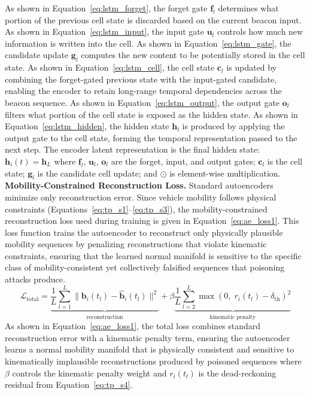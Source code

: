 \documentclass[12pt, a4paper]{report}
\begin{document}
As shown in Equation~\ref{eq:lstm_forget}, the forget gate $\mathbf{f}_l$
determines what portion of the previous cell state is discarded based on
the current beacon input. As shown in Equation~\ref{eq:lstm_input}, the
input gate $\mathbf{u}_l$ controls how much new information is written
into the cell. As shown in Equation~\ref{eq:lstm_gate}, the candidate
update $\mathbf{g}_l$ computes the new content to be potentially stored
in the cell state. As shown in Equation~\ref{eq:lstm_cell}, the cell
state $\mathbf{c}_l$ is updated by combining the forget-gated previous
state with the input-gated candidate, enabling the encoder to retain
long-range temporal dependencies across the beacon sequence. As shown in
Equation~\ref{eq:lstm_output}, the output gate $\mathbf{o}_l$ filters
what portion of the cell state is exposed as the hidden state. As shown
in Equation~\ref{eq:lstm_hidden}, the hidden state $\mathbf{h}_l$ is
produced by applying the output gate to the cell state, forming the
temporal representation passed to the next step. The encoder latent
representation is the final hidden state: $\mathbf{h}_i(t) = \mathbf{h}_L$ where $\mathbf{f}_l$, $\mathbf{u}_l$, $\mathbf{o}_l$ are the forget,
input, and output gates; $\mathbf{c}_l$ is the cell state; $\mathbf{g}_l$
is the candidate cell update; and $\odot$ is element-wise multiplication.
\newline
\newline
\textbf{Mobility-Constrained Reconstruction Loss.}
Standard autoencoders minimize only reconstruction error. Since vehicle
mobility follows physical constraints
(Equations~\ref{eq:tp_s1}--\ref{eq:tp_s3}), the mobility-constrained
reconstruction loss used during training is given in
Equation~\ref{eq:ae_loss1}.
\newline
\newline
This loss function trains the autoencoder to reconstruct only
physically plausible mobility sequences by penalizing reconstructions
that violate kinematic constraints, ensuring that the learned normal
manifold is sensitive to the specific class of mobility-consistent
yet collectively falsified sequences that poisoning attacks produce.
\begin{equation}
  \mathcal{L}_{\mathrm{total}} = \underbrace{\frac{1}{L}\sum_{l=1}^{L}
    \|\mathbf{b}_i(t_l) - \hat{\mathbf{b}}_i(t_l)\|^2}_{\text{reconstruction}}
  + \beta \underbrace{\frac{1}{L}\sum_{l=2}^{L}
    \max\!\left(0,\; r_i(t_l) - \delta_{\mathrm{th}}\right)^2}_{\text{kinematic penalty}}
  \label{eq:ae_loss1}
\end{equation}
 As shown in
Equation~\ref{eq:ae_loss1}, the total loss combines standard
reconstruction error with a kinematic penalty term, ensuring the
autoencoder learns a normal mobility manifold that is physically
consistent and sensitive to kinematically implausible reconstructions
produced by poisoned sequences where $\beta$ controls the kinematic
penalty weight and $r_i(t_l)$ is the dead-reckoning residual from
Equation~\ref{eq:tp_s4}.
\end{document}
